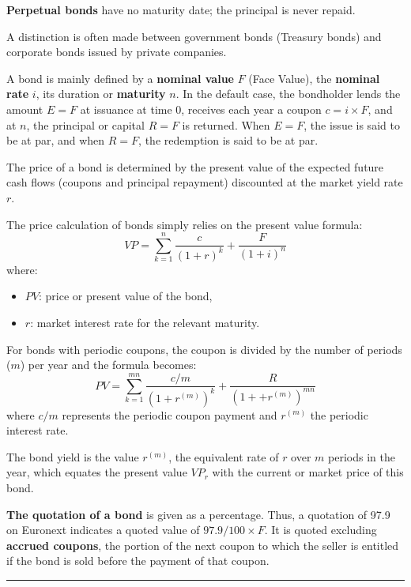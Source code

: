 \begin{f}
\textbf{Perpetual bonds} have no maturity date; the principal is never repaid.

A distinction is often made between government bonds (Treasury bonds) and
corporate bonds issued by private companies.



A bond is mainly defined by a \textbf{nominal value} $F$ (Face Value), the \textbf{nominal rate} $i$, its duration or \textbf{maturity} $n$.
In the default case, the bondholder lends the amount $E=F$ at issuance at time 0, receives each year a coupon $c = i \times F$, and at $n$, the principal or capital $R=F$ is returned.
When $E=F$, the issue is said to be at par, and when $R=F$, the redemption is said to be at par.

The price of a bond is determined by the present value of the expected future cash flows (coupons and principal repayment) discounted at the market yield rate $r$.

The price calculation of bonds simply relies on the present value formula:
\[
VP = \sum_{k=1}^{n} \frac{c}{(1 + r)^k} + \frac{F}{(1 + i)^n}
 \]
where:
\begin{itemize}
    \item $PV$: price or present value of the bond,
	\item $r$: market interest rate for the relevant maturity.
\end{itemize}


For bonds with periodic coupons, the coupon is divided by the number of periods ($m$) per year and the formula becomes:
\[ 
PV = \sum_{k=1}^{mn} \frac{c/m}{(1 + r^{(m)})^k} + \frac{R}{(1 + + r^{(m)})^{mn}}
 \]
where $c/m$ represents the periodic coupon payment and $r^{(m)}$ the periodic interest rate.

The bond yield is the value $r^{(m)}$, the equivalent rate of $r$ over $m$ periods in the year, which equates the present value $VP_r$ with the current or market price of this bond.

\textbf{The quotation of a bond} is given as a percentage. Thus, a quotation of 97.9 on Euronext indicates a quoted value of $97.9 / 100 \times F$.  
It is quoted excluding \textbf{accrued coupons}, the portion of the next coupon to which the seller is entitled if the bond is sold before the payment of that coupon.
\end{f}
\hrule

